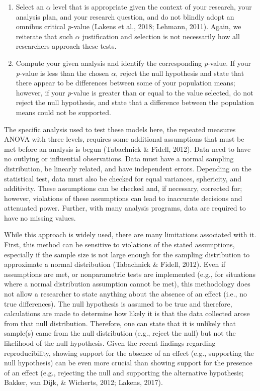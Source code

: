 \documentclass[,man, mask]{apa6}
\begin{document}
\begin{enumerate}
\def\labelenumi{\arabic{enumi})}
\setcounter{enumi}{1}
\item
  Select an \(\alpha\) level that is appropriate given the context of your research, your analysis plan, and your research question, and do not blindly adopt an omnibus critical \emph{p}-value (Lakens et al., 2018; Lehmann, 2011). Again, we reiterate that such \(\alpha\) justification and selection is not necessarily how all researchers approach these tests.
\item
  Compute your given analysis and identify the corresponding \emph{p}-value. If your \emph{p}-value is less than the chosen \(\alpha\), reject the null hypothesis and state that there appear to be differences between some of your population means; however, if your \emph{p}-value is greater than or equal to the value selected, do not reject the null hypothesis, and state that a difference between the population means could not be supported.
\end{enumerate}

The specific analysis used to test these models here, the repeated measures ANOVA with three levels, requires some additional assumptions that must be met before an analysis is begun (Tabachnick \& Fidell, 2012). Data need to have no outlying or influential observations. Data must have a normal sampling distribution, be linearly related, and have independent errors. Depending on the statistical test, data must also be checked for equal variances, sphericity, and additivity. These assumptions can be checked and, if necessary, corrected for; however, violations of these assumptions can lead to inaccurate decisions and attenuated power. Further, with many analysis programs, data are required to have no missing values.

While this approach is widely used, there are many limitations associated with it. First, this method can be sensitive to violations of the stated assumptions, especially if the sample size is not large enough for the sampling distribution to approximate a normal distribution (Tabachnick \& Fidell, 2012). Even if assumptions are met, or nonparametric tests are implemented (e.g., for situations where a normal distribution assumption cannot be met), this methodology does not allow a researcher to state anything about the absence of an effect (i.e., no true differences). The null hypothesis is assumed to be true and therefore, calculations are made to determine how likely it is that the data collected arose from that null distribution. Therefore, one can state that it is unlikely that sample(s) came from the null distribution (e.g., reject the null) but not the likelihood of the null hypothesis. Given the recent findings regarding reproducibility, showing support for the absence of an effect (e.g., supporting the null hypothesis) can be even more crucial than showing support for the presence of an effect (e.g., rejecting the null and supporting the alternative hypothesis; Bakker, van Dijk, \& Wicherts, 2012; Lakens, 2017).
\end{document}
